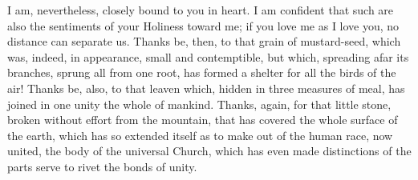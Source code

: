 I am, nevertheless, closely bound to you in heart. I am confident that such are also the sentiments of your Holiness toward me; if you love me as I love you, no distance can separate us. Thanks be, then, to that grain of mustard-seed, which was, indeed, in appearance, small and contemptible, but which, spreading afar its branches, sprung all from one root, has formed a shelter for all the birds of the air! Thanks be, also, to that leaven which, hidden in three measures of meal, has joined in one unity the whole of mankind. Thanks, again, for that little stone, broken without effort from the mountain, that has covered the whole surface of the earth, which has so extended itself as to make out of the human race, now united, the body of the universal Church, which has even made distinctions of the parts serve to rivet the bonds of unity.

